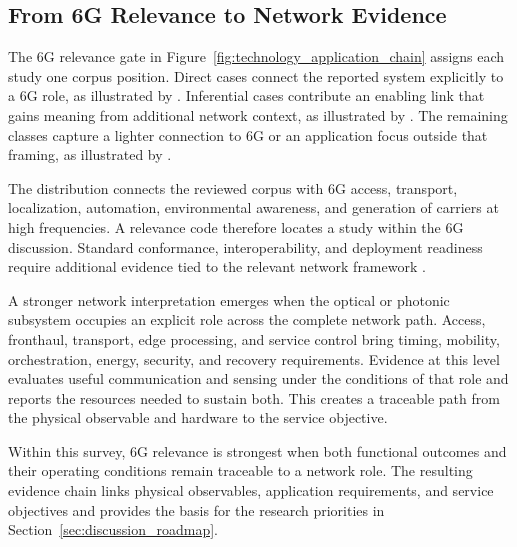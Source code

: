 \subsection{From 6G Relevance to Network Evidence}

The 6G relevance gate in Figure~\ref{fig:technology_application_chain} assigns
each study one corpus position. Direct cases connect the reported system
explicitly to a 6G role, as illustrated
by \cite{OISAC_SCR00362,OISAC_SCR01049}. Inferential cases contribute an
enabling link that gains meaning from additional network context, as illustrated
by \cite{OISAC_SCR00007,OISAC_SCR00647}. The remaining classes capture a lighter
connection to 6G or an application focus outside that framing, as illustrated
by \cite{OISAC_SCR00959,OISAC_SCR00294}.

The distribution connects the reviewed corpus with 6G access, transport,
localization, automation, environmental awareness, and generation of carriers
at high frequencies. A relevance code therefore locates a study within the 6G
discussion. Standard conformance, interoperability, and deployment readiness
require additional evidence tied to the relevant network framework
\cite{ITUR_M2160_2023}.

A stronger network interpretation emerges when the optical or photonic
subsystem occupies an explicit role across the complete network path. Access, fronthaul, transport,
edge processing, and service control bring timing, mobility, orchestration,
energy, security, and recovery requirements. Evidence at this level evaluates
useful communication and sensing under the conditions of that role and reports
the resources needed to sustain both. This creates a traceable path from the
physical observable and hardware to the service objective.

Within this survey, 6G relevance is strongest when both functional outcomes and
their operating conditions remain traceable to a network role. The resulting
evidence chain links physical observables, application requirements, and service
objectives and provides the basis for the research priorities in
Section~\ref{sec:discussion_roadmap}.
